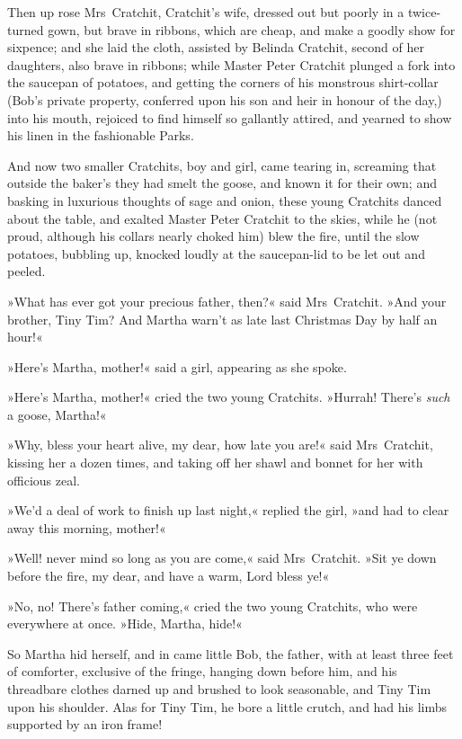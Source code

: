 Then up rose Mrs~Cratchit, Cratchit's wife, dressed out but poorly in a twice-turned gown, but brave in ribbons, which are cheap, and make a goodly show for sixpence; and she laid the cloth, assisted by Belinda Cratchit, second of her daughters, also brave in ribbons; while Master Peter Cratchit plunged a fork into the saucepan of potatoes, and getting the corners of his monstrous shirt-collar (Bob's private property, conferred upon his son and heir in honour of the day,) into his mouth, rejoiced to find himself so gallantly attired, and yearned to show his linen in the fashionable Parks. 

And now two smaller Cratchits, boy and girl, came tearing in, screaming that outside the baker's they had smelt the goose, and known it for their own; and basking in luxurious thoughts of sage and onion, these young Cratchits danced about the table, and exalted Master Peter Cratchit to the skies, while he (not proud, although his collars nearly choked him) blew the fire, until the slow potatoes, bubbling up, knocked loudly at the saucepan-lid to be let out and peeled.





»What has ever got your precious father, then?« said Mrs~Cratchit. »And your brother, Tiny Tim? And Martha warn't as late last Christmas Day by half an hour!«

»Here's Martha, mother!« said a girl, appearing as she spoke.

»Here's Martha, mother!« cried the two young Cratchits. »Hurrah! There's \textit{such} a goose, Martha!«

»Why, bless your heart alive, my dear, how late you are!« said Mrs~Cratchit, kissing her a dozen times, and taking off her shawl and bonnet for her with officious zeal.

»We'd a deal of work to finish up last night,« replied the girl, »and had to clear away this morning, mother!«


»Well! never mind so long as you are come,« said Mrs~Cratchit. »Sit ye down before the fire, my dear, and have a warm, Lord bless ye!«

»No, no! There's father coming,« cried the two young Cratchits, who were everywhere at once. »Hide, Martha, hide!«


So Martha hid herself, and in came little Bob, the father, with at least three feet of comforter, exclusive of the fringe, hanging down before him, and his threadbare clothes darned up and brushed to look seasonable, and Tiny Tim upon his shoulder. Alas for Tiny Tim, he bore a little crutch, and had his limbs supported by an iron frame!

